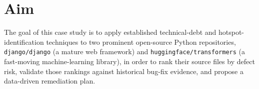 \documentclass[12pt,a4paper]{article}
\begin{document}
\begin{titlepage}
\vspace{0.65cm}

\vfill

\end{titlepage}

\newpage
{}
\tableofcontents
\newpage
{}

\section{Aim}
\label{sec:aim}

The goal of this case study is to apply established technical-debt and hotspot-identification techniques to two prominent open-source Python repositories, \texttt{django/django} (a mature web framework) and \texttt{huggingface/transformers} (a fast-moving machine-learning library), in order to rank their source files by defect risk, validate those rankings against historical bug-fix evidence, and propose a data-driven remediation plan.
\end{document}
